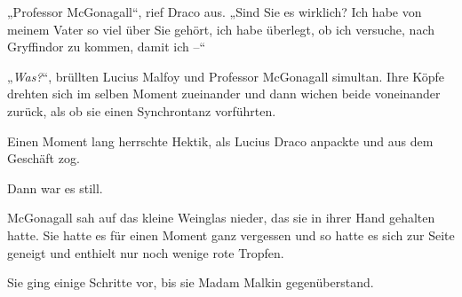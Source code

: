 „Professor McGonagall“, rief Draco aus. „Sind Sie es wirklich? Ich habe von meinem Vater so viel über Sie gehört, ich habe überlegt, ob ich versuche, nach Gryffindor zu kommen, damit ich –“

„\emph{Was?}“, brüllten Lucius Malfoy und Professor McGonagall simultan. Ihre Köpfe drehten sich im selben Moment zueinander und dann wichen beide voneinander zurück, als ob sie einen Synchrontanz vorführten.

Einen Moment lang herrschte Hektik, als Lucius Draco anpackte und aus dem Geschäft zog.

Dann war es still.

McGonagall sah auf das kleine Weinglas nieder, das sie in ihrer Hand gehalten hatte. Sie hatte es für einen Moment ganz vergessen und so hatte es sich zur Seite geneigt und enthielt nur noch wenige rote Tropfen.

Sie ging einige Schritte vor, bis sie Madam Malkin gegenüberstand.

